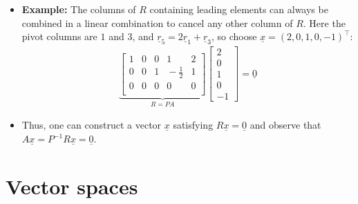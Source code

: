 \documentclass[11pt,twoside]{report}
\newcommand{\vecnot}{\underline}
\begin{document}
\begin{itemize}
\begin{itemize}
\item \textbf{Example:} The columns of $R$ containing leading elements can always be combined in a linear combination to cancel any other column of $R$.  Here the pivot columns are $1$ and $3$, and $\vecnot{r}_5=2\vecnot{r}_1+\vecnot{r}_3$, so choose $\vecnot{x}=(2,0,1,0,-1)^\top$:
\begin{align}
 \underbrace{\begin{bmatrix}
1 & 0 & 0 & 1  & 2 \\
0 & 0 & 1 & \!\!\!-\frac{1}{2} & 1  \\
0 & 0 & 0 & 0 & 0 \\
\end{bmatrix}}_{R = PA} \begin{bmatrix} 2 \\ 0 \\ 1 \\ 0 \\ -1 \end{bmatrix} = \vecnot{0}
\end{align}

\item Thus, one can construct a vector $\vecnot{x}$ satisfying $R\vecnot{x}=\vecnot{0}$ and observe that $A \vecnot{x} = P^{-1} R \vecnot{x} = \vecnot{0}$. \hfill \qedhere
\end{itemize}

  
  \end{itemize}


\section{Vector spaces}
\end{document}
